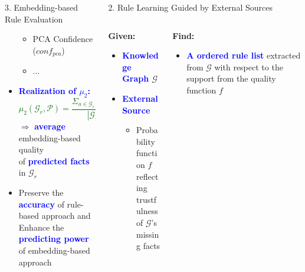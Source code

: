 \documentclass[t,final,hyperref={pdfpagelabels=true}]{beamer}
\def\cG{\ensuremath{\mathcal{G}}}
\newcommand{\bl}[1]{\textcolor{blue}{#1}}
\newcommand{\gr}[1]{\textcolor{darkgreen}{#1}}
\begin{document}
\begin{frame}
\begin{columns}[t]
\begin{column}{.5\textwidth}
\begin{block}{3. Embedding-based Rule Evaluation}
\begin{itemize}
\begin{itemize}
					      	      \medskip
					      	\item PCA Confidence ($conf_{pca}$) \cite{}
					      	      \medskip
					      	\item ...
					      \end{itemize}
					\item \textbf{\bl{Realization of $\mu_2$:}}\\
					      \vspace{1em}
					      \hspace{2.5em}\gr{$\mu_2(\cG_r,\mathcal{P}) = \dfrac{\Sigma_{a\in \cG_r\backslash \cG}\ f(a)}{ |\cG_r \backslash \cG|}$}\\
					      \vspace{1em}
					      $\Rightarrow$ \textbf{\bl{average}} embedding-based quality \\of \textbf{\bl{predicted facts}} in $\cG_r$\\
					      \vspace{1em}					
					\item Preserve the \textbf{\bl{accuracy}} of rule-based approach and\\Enhance the \textbf{\bl{predicting power}} of embedding-based approach
					      
				\end{itemize}
			\end{block}
		\end{column}
				
				
		\begin{column}{.5\textwidth}
			\begin{block}{2. Rule Learning Guided by External Sources}
				\vspace{-0.4em}
				\begin{columns}
					\begin{column}{.45\textwidth}
						\small
						\textbf{Given:}
						\begin{itemize}
							\item \textbf{\bl{Knowledge Graph} $\mathcal{G}$}
							\item \textbf{\bl{External Source}}
							      \begin{itemize}
							      	\item Probability function $f$ reflecting \\trustfulness of $\mathcal{G}$'s missing facts
							      \end{itemize}					
						\end{itemize}
					\end{column}
					\begin{column}{.45\textwidth}
						\small
						\textbf{Find:}
						\begin{itemize}
							\item \textbf{\bl{A ordered rule list}} extracted from $\mathcal{G}$ with respect to the support from the quality function $f$ 
						\end{itemize}
											

\end{column}
\end{columns}
\end{block}
\end{column}
\end{columns}
\end{frame}
\end{document}
